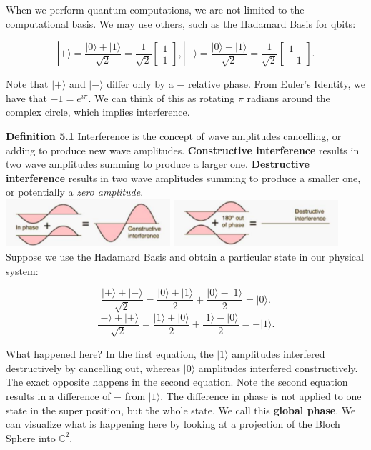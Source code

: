 \documentclass[letterpaper, 10 pt, conference]{ieeeconf}
\begin{document}
When we perform quantum computations, we are not limited to the computational basis.  We may use others, such as the Hadamard Basis for qbits:

\[
|+\rangle = \frac{|0\rangle + |1\rangle}{\sqrt{2}} =
\frac{1}{\sqrt{2}}\begin{bmatrix} 1 \\ 1 \end{bmatrix},
|-\rangle = \frac{|0\rangle - |1\rangle}{\sqrt{2}} =
\frac{1}{\sqrt{2}}\begin{bmatrix} 1 \\ -1 \end{bmatrix}.
\]

Note that \( |+\rangle \) and \( |-\rangle \) differ only by a \(-\) relative phase.  From Euler's Identity, we have that \( -1 = e^{i\pi} \).  We can think of this as rotating \( \pi \) radians around the complex circle, which implies interference.

\textbf{Definition 5.1} Interference is the concept of wave amplitudes cancelling, or adding to produce new wave amplitudes.  \textbf{Constructive interference} results in two wave amplitudes summing to produce a larger one.  \textbf{Destructive interference} results in two wave amplitudes summing to produce a smaller one, or potentially a \textit{zero amplitude}.\\

\includegraphics[width=230px]{phase1.png}
\hspace*{+0.35cm}\includegraphics[width=230px]{phase2.png}\\

Suppose we use the Hadamard Basis and obtain a particular state in our physical system:

\[
\frac{|+\rangle + |-\rangle}{\sqrt{2}} =
\frac{|0\rangle + |1\rangle}{2} + 
\frac{|0\rangle - |1\rangle}{2} = |0\rangle.
\]
\[
\frac{|-\rangle + |+\rangle}{\sqrt{2}} =
\frac{|1\rangle + |0\rangle}{2} + 
\frac{|1\rangle - |0\rangle}{2} = -|1\rangle.
\]

What happened here?  In the first equation, the \( |1\rangle \) amplitudes interfered destructively by cancelling out, whereas \( |0\rangle \) amplitudes interfered constructively.  The exact opposite happens in the second equation.  Note the second equation results in a difference of \( - \) from \( |1\rangle \).  The difference in phase is not applied to one state in the super position, but the whole state.  We call this \textbf{global phase}.  We can visualize what is happening here by looking at a projection of the Bloch Sphere into \(\mathbb{C}^2\).
\end{document}
